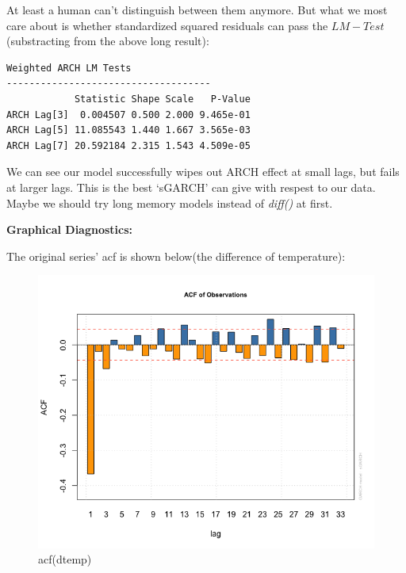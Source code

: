 \documentclass[a4paper, 11pt]{article}
\begin{document}
\indent At least a human can't distinguish between them anymore. But what we most care about is whether standardized squared residuals can pass the $LM-Test$(substracting from the above long result):

\begin{verbatim}
Weighted ARCH LM Tests
------------------------------------
            Statistic Shape Scale   P-Value
ARCH Lag[3]  0.004507 0.500 2.000 9.465e-01
ARCH Lag[5] 11.085543 1.440 1.667 3.565e-03
ARCH Lag[7] 20.592184 2.315 1.543 4.509e-05
\end{verbatim}

We can see our model successfully wipes out ARCH effect at small lags, but fails at larger lags. This is the best `sGARCH' can give with respest to our data. Maybe we should try long memory models instead of \textit{diff()} at first.\par




\textbf{Graphical Diagnostics:}\par
The original series' acf is shown below(the difference of temperature):
\begin{figure}[H]
\centering
\caption{acf(dtemp)}
\includegraphics[scale=.60]{original_acf.png}
\end{figure}
\end{document}
